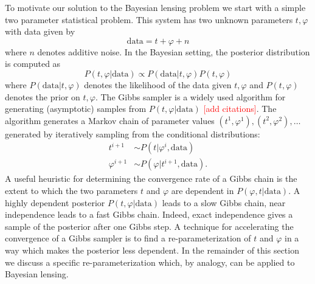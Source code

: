 \documentclass[noinfoline]{imsart}
\begin{document}
To motivate our solution to the Bayesian lensing problem we start with a simple two parameter statistical problem.  This system has two unknown parameters $ t, \varphi$ with data given by
\[\text{data} =  t + \varphi + n\]
where $n$ denotes additive noise.  In the Bayesian setting, the posterior distribution is computed as 
\begin{equation}
\label{post1}
 P( t,\varphi|\text{data})\propto P(\text{data}| t, \varphi) P( t,\varphi) 
 \end{equation}
where $P(\text{data}| t, \varphi)$ denotes the likelihood of the data given  $ t, \varphi$ and $P( t,\varphi)$ denotes the  prior on $ t, \varphi$. 
The Gibbs sampler is a widely used algorithm for generating (asymptotic) samples from  $P( t, \varphi|\text{data})$ \textcolor{red}{[add citations]}. The algorithm generates a Markov chain of parameter values $( t^{1}, \varphi^{1}), ( t^{2}, \varphi^{2}),\ldots$ generated by iteratively sampling from the conditional distributions:
\begin{align*}
 t^{i+1} &\sim P( t|\varphi^{i},\text{data}) \\
\varphi^{i+1}   &\sim P(\varphi| t^{i+1},\text{data}).
\end{align*}
A useful heuristic for determining the convergence rate of a Gibbs chain is the extent to which the two parameters $ t$ and $\varphi$ are dependent in $P(\varphi,  t|\text{data})$. A highly dependent posterior $P( t, \varphi|\text{data})$ leads to a slow Gibbs chain, near independence leads to a fast Gibbs chain. Indeed, exact independence gives a sample of the posterior after one Gibbs step.  A technique for accelerating the convergence of a Gibbs sampler is to find a  re-parameterization of $ t$ and $\varphi$ in a way which makes the posterior less dependent. In the remainder of this section we discuss a specific re-parameterization which, by analogy, can be applied to Bayesian lensing.
\end{document}

